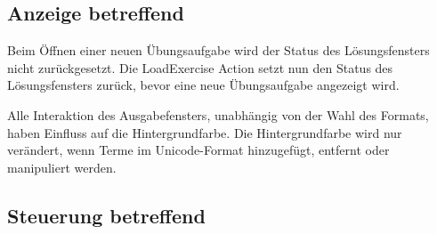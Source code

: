 \documentclass[parskip=full,11pt,openany]{scrreprt}
\begin{document}
\subsection{Anzeige betreffend}

\begin{itemize}[itemsep=3ex]
	
	{Beim Öffnen einer neuen Übungsaufgabe wird der Status des Lösungsfensters nicht zurückgesetzt.}
	{Die LoadExercise Action setzt nun den Status des Lösungsfensters zurück, bevor eine neue Übungsaufgabe angezeigt wird.}
	
	{Alle Interaktion des Ausgabefensters, unabhängig von der Wahl des Formats, haben Einfluss auf die Hintergrundfarbe.}
	{Die Hintergrundfarbe wird nur verändert, wenn Terme im Unicode-Format hinzugefügt, entfernt oder manipuliert werden.}
\end{itemize}

\subsection{Steuerung betreffend}
\end{document}
